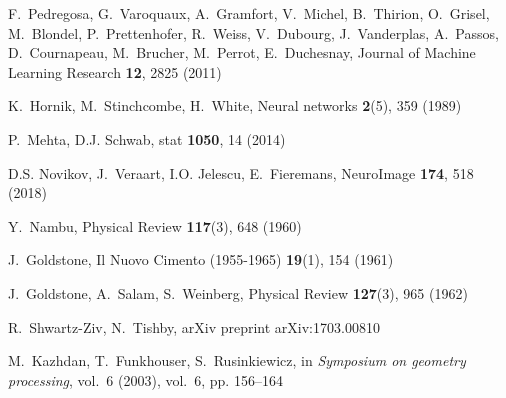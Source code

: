 \documentclass{svproc}
\begin{document}
\begin{thebibliography}{10}
	F.~Pedregosa, G.~Varoquaux, A.~Gramfort, V.~Michel, B.~Thirion, O.~Grisel,
	M.~Blondel, P.~Prettenhofer, R.~Weiss, V.~Dubourg, J.~Vanderplas, A.~Passos,
	D.~Cournapeau, M.~Brucher, M.~Perrot, E.~Duchesnay, Journal of Machine
	Learning Research \textbf{12}, 2825 (2011)
	
	K.~Hornik, M.~Stinchcombe, H.~White, Neural networks \textbf{2}(5), 359 (1989)
	
	P.~Mehta, D.J. Schwab, stat \textbf{1050}, 14 (2014)
	
	D.S. Novikov, J.~Veraart, I.O. Jelescu, E.~Fieremans, NeuroImage \textbf{174},
	518 (2018)
	
	Y.~Nambu, Physical Review \textbf{117}(3), 648 (1960)
	
	J.~Goldstone, Il Nuovo Cimento (1955-1965) \textbf{19}(1), 154 (1961)
	
	J.~Goldstone, A.~Salam, S.~Weinberg, Physical Review \textbf{127}(3), 965
	(1962)
	
	R.~Shwartz-Ziv, N.~Tishby, arXiv preprint arXiv:1703.00810
	
	M.~Kazhdan, T.~Funkhouser, S.~Rusinkiewicz, in \emph{Symposium on geometry
		processing}, vol.~6 (2003), vol.~6, pp. 156--164
	
\end{thebibliography}


\vskip 0.2in
\end{document}
